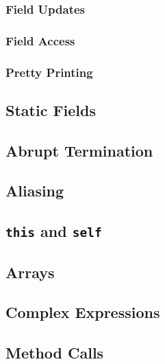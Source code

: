 \documentclass[a4paper, 11pt, accentcolor = tud3b]{tudreport}
\begin{document}
				\subsubsection{Field Updates} %

				\subsubsection{Field Access} %

				\subsubsection{Pretty Printing} %

			\subsection{Static Fields} %

			\subsection{Abrupt Termination} %

			\subsection{Aliasing} %

			\subsection{\texttt{this} and \texttt{self}} %

			\subsection{Arrays} %

			\subsection{Complex Expressions} %

			\subsection{Method Calls} %
\end{document}
